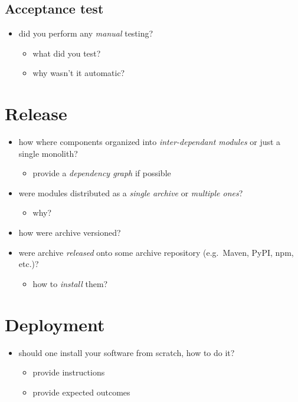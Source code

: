 \documentclass{scrartcl}
\begin{document}
\subsection{Acceptance test}\label{acceptance-test}

\begin{itemize}
  \item did you perform any \emph{manual} testing?

  \begin{itemize}
    \item what did you test?
    \item why wasn't it automatic?
  \end{itemize}
\end{itemize}

\section{Release}\label{release}

\begin{itemize}
  \item how where components organized into \emph{inter-dependant modules} or
  just a single monolith?

  \begin{itemize}
    \item provide a \emph{dependency graph} if possible
  \end{itemize}
  \item were modules distributed as a \emph{single archive} or \emph{multiple
  ones}?

  \begin{itemize}
    \item why?
  \end{itemize}
  \item how were archive versioned?
  \item were archive \emph{released} onto some archive repository (e.g.~Maven,
  PyPI, npm, etc.)?

  \begin{itemize}
    \item how to \emph{install} them?
  \end{itemize}
\end{itemize}

\section{Deployment}\label{deployment}

\begin{itemize}
  \item should one install your software from scratch, how to do it?

  \begin{itemize}
    \item provide instructions
    \item provide expected outcomes
  \end{itemize}
\end{itemize}
\end{document}
